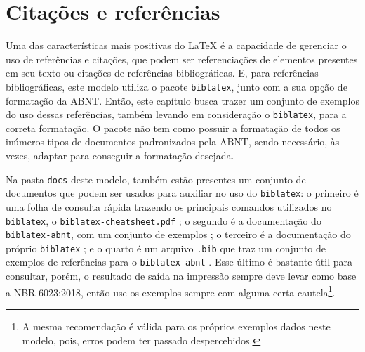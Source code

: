 \chapter{Citações e referências}\label{capitulo:referencias}
Uma das características mais positivas do \LaTeX{} é a capacidade de gerenciar o uso de referências e citações, que podem ser referenciações de elementos presentes em seu texto ou citações de referências bibliográficas. E, para referências bibliográficas\footnotemark, este modelo utiliza o pacote \verb|biblatex|, junto com a sua opção de formatação da ABNT. Então, este capítulo busca trazer um conjunto de exemplos do uso dessas referências, também levando em consideração o \verb|biblatex|, para a correta formatação. O pacote não tem como possuir a formatação de todos os inúmeros tipos de documentos padronizados pela ABNT, sendo necessário, às vezes, adaptar para conseguir a formatação desejada.

  Na pasta \texttt{docs} deste modelo, também estão presentes um conjunto de documentos que podem ser usados para auxiliar no uso do \texttt{biblatex}: o primeiro é uma folha de consulta rápida trazendo os principais comandos utilizados no \texttt{biblatex}, o \texttt{biblatex-cheatsheet.pdf} \cite{pdf:biblatex-cheatsheet}; o segundo é a documentação do \\\texttt{biblatex-abnt}, com um conjunto de exemplos \cite{pdf:biblatex-abnt}; o terceiro é a documentação do próprio \texttt{biblatex} \cite{pdf:biblatex}; e o quarto é um arquivo \texttt{.bib} que traz um conjunto de exemplos de referências para o \texttt{biblatex-abnt} \cite{bib:biblatex-abnt}. Esse último é bastante útil para consultar, porém, o resultado de saída na impressão sempre deve levar como base a NBR 6023:2018, então use os exemplos sempre com alguma certa cautela\footnote{A mesma recomendação é válida para os próprios exemplos dados neste modelo, pois, erros podem ter passado despercebidos.}.

